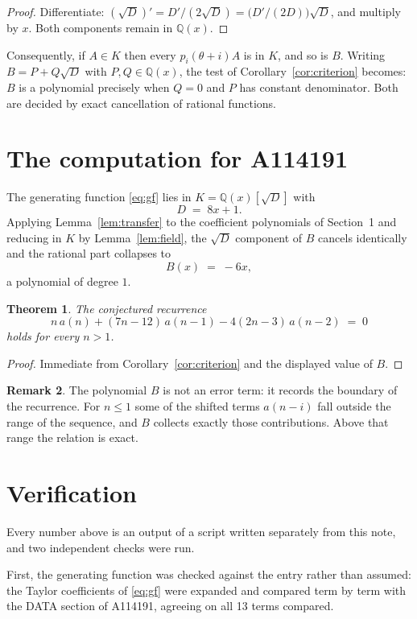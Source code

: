 \documentclass[11pt,a4paper]{article}
\theoremstyle{plain}
\newtheorem{theorem}{Theorem}
\theoremstyle{definition}
\newtheorem{remark}[theorem]{Remark}
\begin{document}
\begin{proof}
Differentiate: $(\sqrt{D})'=D'/(2\sqrt{D})=\bigl(D'/(2D)\bigr)\sqrt{D}$, and multiply by
$x$. Both components remain in $\mathbb{Q}(x)$.
\end{proof}

Consequently, if $A\in K$ then every $p_{i}(\theta+i)A$ is in $K$, and so is $B$. Writing
$B=P+Q\sqrt{D}$ with $P,Q\in\mathbb{Q}(x)$, the test of Corollary~\ref{cor:criterion}
becomes: $B$ is a polynomial precisely when $Q=0$ and $P$ has constant denominator. Both
are decided by exact cancellation of rational functions.

\section{The computation for A114191}

The generating function \eqref{eq:gf} lies in $K=\mathbb{Q}(x)[\sqrt{D}]$ with
\[
D \;=\; 8 x + 1 .
\]
Applying Lemma~\ref{lem:transfer} to the coefficient polynomials of Section~1 and reducing
in $K$ by Lemma~\ref{lem:field}, the $\sqrt{D}$ component of $B$ cancels identically and
the rational part collapses to
\[
B(x)\;=\;- 6 x ,
\]
a polynomial of degree $1$.

\begin{theorem}
The conjectured recurrence
\[
n\,a(n) + (7 n - 12)\,a(n-1) -  4 \left(2 n - 3\right)\,a(n-2) \;=\;0
\]
holds for every $n>1$.
\end{theorem}

\begin{proof}
Immediate from Corollary~\ref{cor:criterion} and the displayed value of $B$.
\end{proof}

\begin{remark}
The polynomial $B$ is not an error term: it records the boundary of the recurrence. For
$n\le1$ some of the shifted terms $a(n-i)$ fall outside the range of the sequence,
and $B$ collects exactly those contributions. Above that range the relation is exact.
\end{remark}

\section{Verification}

Every number above is an output of a script written separately from this note, and two
independent checks were run.

First, the generating function was checked against the entry rather than assumed: the
Taylor coefficients of \eqref{eq:gf} were expanded and compared term by term with the DATA
section of A114191, agreeing on all 13 terms compared.
\end{document}
